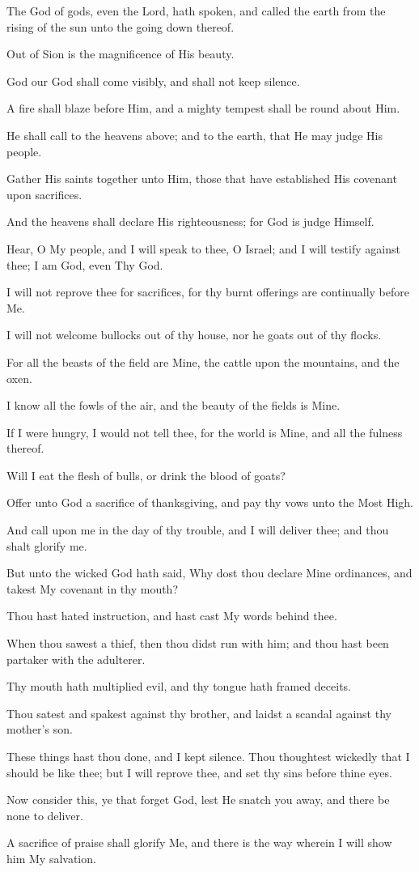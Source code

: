 The God of gods, even the Lord, hath spoken, and called the earth from the rising of the sun unto the going down thereof.

Out of Sion is the magnificence of His beauty.

God our God shall come visibly, and shall not keep silence.

A fire shall blaze before Him, and a mighty tempest shall be round about Him.

He shall call to the heavens above; and to the earth, that He may judge His people.

Gather His saints together unto Him, those that have established His covenant upon sacrifices.

And the heavens shall declare His righteousness; for God is judge Himself.

Hear, O My people, and I will speak to thee, O Israel; and I will testify against thee; I am God, even Thy God.

I will not reprove thee for sacrifices, for thy burnt offerings are continually before Me.

I will not welcome bullocks out of thy house, nor he goats out of thy flocks.

For all the beasts of the field are Mine, the cattle upon the mountains, and the oxen.

I know all the fowls of the air, and the beauty of the fields is
Mine.

If I were hungry, I would not tell thee, for the world is Mine, and all the fulness thereof.

Will I eat the flesh of bulls, or drink the blood of goats?

Offer unto God a sacrifice of thanksgiving, and pay thy vows unto the Most High.

And call upon me in the day of thy trouble, and I will deliver thee; and thou shalt glorify me.

But unto the wicked God hath said, Why dost thou declare Mine ordinances, and takest My covenant in thy mouth?

Thou hast hated instruction, and hast cast My words behind thee.

When thou sawest a thief, then thou didst run with him; and thou hast been partaker with the adulterer.

Thy mouth hath multiplied evil, and thy tongue hath framed deceits.

Thou satest and spakest against thy brother, and laidst a scandal against thy mother's son.

These things hast thou done, and I kept silence. Thou thoughtest wickedly that I should be like thee; but I will reprove thee, and set thy sins before thine eyes.

Now consider this, ye that forget God, lest He snatch you away, and there be none to deliver.

A sacrifice of praise shall glorify Me, and there is the way wherein I will show him My salvation.
